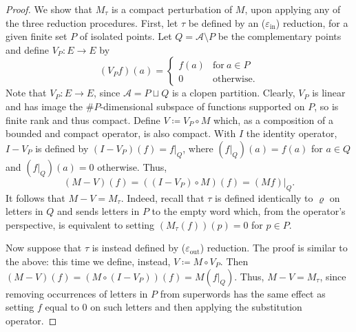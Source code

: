 \documentclass[11pt]{amsart}
\numberwithin{equation}{section}
\theoremstyle{plain}
\theoremstyle{definition}
\newcommand{\mc}{\mathcal}
\newcommand{\A}{\mc A}
\newcommand{\sub}{\varrho}
\begin{document}
\begin{proof}
We show that \(M_\tau\) is a compact perturbation of \(M\), upon applying any of the three reduction procedures. First, let \(\tau\) be defined by an (\(\varepsilon_\mathrm{in}\)) reduction, for a given finite set \(P\) of isolated points. Let \(Q = \A \setminus P\) be the complementary points and define \(V_P \colon E \to E\) by 
\[
(V_P f)(a) =
\begin{cases}
f(a) & \text{for} \ a \in P \\
0    & \text{otherwise.}
\end{cases}
\]
Note that \(V_P \colon E \to E\), since \(\A = P \sqcup Q\) is a clopen partition. Clearly, \(V_P\) is linear and has image the \(\#P\)-dimensional subspace of functions supported on \(P\), so is finite rank and thus compact. Define \(V \coloneqq V_P \circ M\) which, as a composition of a bounded and compact operator, is also compact. With \(I\) the identity operator, \(I - V_P\) is defined by \((I - V_P)(f) = f |_Q\), where \((f |_Q)(a) = f(a)\) for \(a \in Q\) and \((f |_Q)(a) = 0\) otherwise. Thus,
\[
(M-V)(f) = ((I-V_P) \circ M)(f) = (Mf) |_Q .
\]
It follows that \(M - V = M_\tau\). Indeed, recall that \(\tau\) is defined identically to \(\sub\) on letters in \(Q\) and sends letters in \(P\) to the empty word which, from the operator's perspective, is equivalent to setting \((M_\tau(f))(p) = 0\) for \(p \in P\).

Now suppose that \(\tau\) is instead defined by (\(\varepsilon_\mathrm{out}\)) reduction. The proof is similar to the above: this time we define, instead, \(V \coloneqq M \circ V_P\). Then \((M-V)(f) = (M \circ (I-V_P))(f) = M (f|_Q)\). Thus, \(M-V = M_\tau\), since removing occurrences of letters in \(P\) from superwords has the same effect as setting \(f\) equal to \(0\) on such letters and then applying the substitution operator.


\end{proof}
\end{document}
